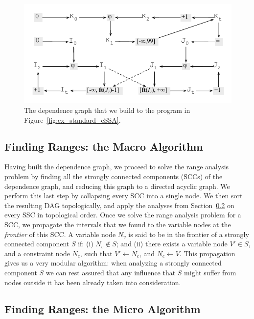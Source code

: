 \documentclass[preprint]{sigplanconf}
\begin{document}
\begin{figure}[t!]
\begin{center}
\includegraphics[width=\columnwidth]{images/ex_graph}
\end{center}
\caption{\label{fig:ex_graph}
The dependence graph that we build to the program in
Figure~\ref{fig:ex_standard_eSSA}.}
\end{figure}

\subsection{Finding Ranges: the Macro Algorithm}
\label{sub:macro}

Having built the dependence graph, we proceed to solve the range analysis
problem by finding all the strongly connected components (SCCs) of the
dependence graph, and reducing this graph to a directed acyclic graph.
We perform this last step by collapsing every SCC into a single node.
We then sort the resulting DAG topologically, and apply the analyses from
Section~\ref{sub:micro} on every SSC in topological order.
Once we solve the range analysis problem for a SCC, we propagate the
intervals that we found to the variable nodes at the {\em frontier} of this
SCC.
A variable node $N_v$ is said to be in the frontier of a strongly connected
component $S$ if:
(i) $N_v \notin S$; and
(ii) there exists a variable node $V' \in S$, and a constraint node $N_c$,
such that $V' \leftarrow N_c$, and $N_c \leftarrow V$.
This propagation gives us a very modular algorithm:
when analyzing a strongly connected component $S$ we can rest assured that
any influence that $S$ might suffer from nodes outside it has been already
taken into consideration.

\subsection{Finding Ranges: the Micro Algorithm}
\label{sub:micro}
\end{document}

